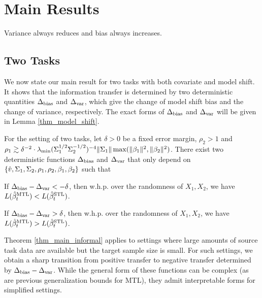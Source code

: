 \section{Main Results}

\begin{proposition}
	Variance always reduces and bias always increases.
\end{proposition}

\subsection{Two Tasks}

We now state our main result for two tasks with both covariate and model shift. It shows that the information transfer is determined by two deterministic quantities $\Delta_{\text{bias}}$ and $\Delta_{\text{var}}$, which give the change of model shift bias and the change of variance, respectively. The exact forms of $\Delta_{\text{bias}}$ and $\Delta_{\text{var}}$ will be given in Lemma \ref{thm_model_shift}.

\begin{theorem}\label{thm_main_informal}
	For the setting of two tasks, let $\delta > 0$ be a fixed error margin, $\rho_2 > 1$ and $\rho_1 \gtrsim \delta^{-2}\cdot \lambda_{\min}(\Sigma_1^{1/2}\Sigma_2^{-1/2})^{-4} \|\Sigma_1\| \max(\|\beta_1\|^2, \|\beta_2\|^2)$.
 	There exist two deterministic functions $\Delta_{\text{bias}}$ and $\Delta_{\text{var}}$ that only depend on $\{\hat{v}, \Sigma_1, \Sigma_2, \rho_1, \rho_2, \beta_1, \beta_2\}$ such that
	\squishlist
		\item If $\Delta_{\text{bias}} - \Delta_{\text{var}} < -\delta$, then w.h.p. over the randomness of $X_1, X_2$, we have $L(\hat{\beta}_t^{\text{MTL}}) < L(\hat{\beta}_t^{\text{STL}})$.
		\item If $\Delta_{\text{bias}} - \Delta_{\text{var}} > \delta$, then w.h.p. over the randomness of $X_1, X_2$, we have $L(\hat{\beta}_t^{\text{MTL}}) > L(\hat{\beta}_t^{\text{STL}})$.
	\squishend
\end{theorem}

Theorem \ref{thm_main_informal} applies to settings where large amounts of source task data are available but the target sample size is small.
For such settings, we obtain a sharp transition from positive transfer to negative transfer determined by $\Delta_{\text{bias}} - \Delta_{\text{var}}$.
While the general form of these functions can be complex (as are previous generalization bounds for MTL), they admit interpretable forms for simplified settings.

